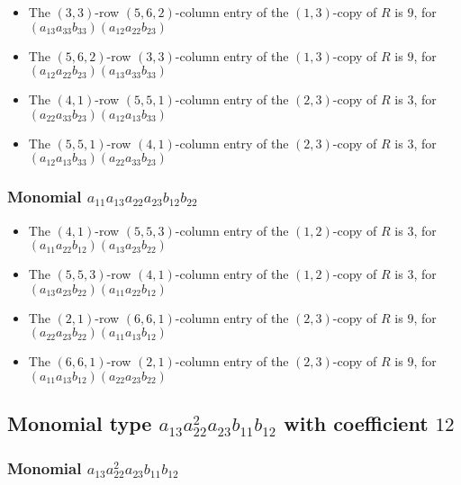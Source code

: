\documentclass{article}
\begin{document}
\begin{itemize}
\item The $(3, 3)$-row $(5, 6, 2)$-column entry of the $ \left(1, 3\right) $-copy of $R$ is $ 9 $, for $( a_{13} a_{33} b_{33} )( a_{12} a_{22} b_{23} )$ 
\item The $(5, 6, 2)$-row $(3, 3)$-column entry of the $ \left(1, 3\right) $-copy of $R$ is $ 9 $, for $( a_{12} a_{22} b_{23} )( a_{13} a_{33} b_{33} )$ 
\item The $(4, 1)$-row $(5, 5, 1)$-column entry of the $ \left(2, 3\right) $-copy of $R$ is $ 3 $, for $( a_{22} a_{33} b_{23} )( a_{12} a_{13} b_{33} )$ 
\item The $(5, 5, 1)$-row $(4, 1)$-column entry of the $ \left(2, 3\right) $-copy of $R$ is $ 3 $, for $( a_{12} a_{13} b_{33} )( a_{22} a_{33} b_{23} )$ 
\end{itemize}
\subsubsection{Monomial $ a_{11} a_{13} a_{22} a_{23} b_{12} b_{22} $}

\begin{itemize}
\item The $(4, 1)$-row $(5, 5, 3)$-column entry of the $ \left(1, 2\right) $-copy of $R$ is $ 3 $, for $( a_{11} a_{22} b_{12} )( a_{13} a_{23} b_{22} )$ 
\item The $(5, 5, 3)$-row $(4, 1)$-column entry of the $ \left(1, 2\right) $-copy of $R$ is $ 3 $, for $( a_{13} a_{23} b_{22} )( a_{11} a_{22} b_{12} )$ 
\item The $(2, 1)$-row $(6, 6, 1)$-column entry of the $ \left(2, 3\right) $-copy of $R$ is $ 9 $, for $( a_{22} a_{23} b_{22} )( a_{11} a_{13} b_{12} )$ 
\item The $(6, 6, 1)$-row $(2, 1)$-column entry of the $ \left(2, 3\right) $-copy of $R$ is $ 9 $, for $( a_{11} a_{13} b_{12} )( a_{22} a_{23} b_{22} )$ 
\end{itemize}
\subsection{Monomial type $ a_{13} a_{22}^{2} a_{23} b_{11} b_{12} $ with coefficient $ 12 $}

\subsubsection{Monomial $ a_{13} a_{22}^{2} a_{23} b_{11} b_{12} $}
\end{document}
